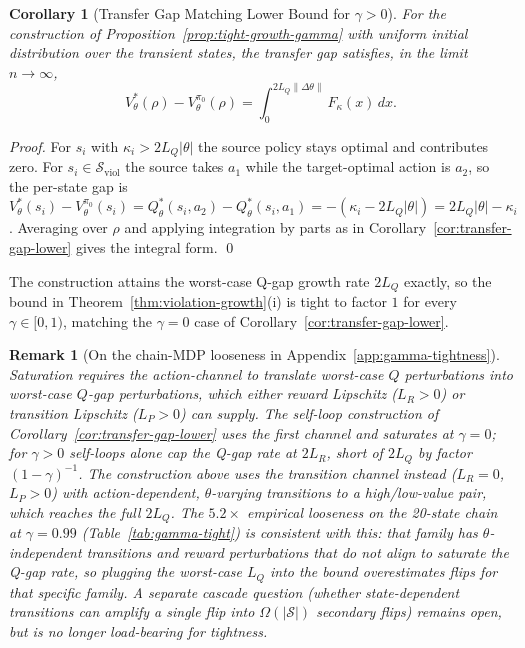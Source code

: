 \documentclass{article}
\newtheorem{corollary}{Corollary}
\newtheorem{remark}{Remark}
\newcommand{\cS}{\mathcal{S}}
\newcommand{\Sviol}{\mathcal{S}_{\mathrm{viol}}}
\begin{document}
\begin{corollary}[Transfer Gap Matching Lower Bound for $\gamma > 0$]
\label{cor:transfer-gap-lower-gamma}
For the construction of Proposition~\ref{prop:tight-growth-gamma} with uniform initial distribution over the transient states, the transfer gap satisfies, in the limit $n \to \infty$,
\[
V^*_\theta(\rho) - V^{\pi_0}_\theta(\rho) = \int_0^{2L_Q\|\Delta\theta\|}\!\! F_\kappa(x)\, dx.
\]
\end{corollary}

\begin{proof}
For $s_i$ with $\kappa_i > 2L_Q|\theta|$ the source policy stays optimal and contributes zero. For $s_i \in \Sviol$ the source takes $a_1$ while the target-optimal action is $a_2$, so the per-state gap is $V^*_\theta(s_i) - V^{\pi_0}_\theta(s_i) = Q^*_\theta(s_i, a_2) - Q^*_\theta(s_i, a_1) = -(\kappa_i - 2L_Q|\theta|) = 2L_Q|\theta| - \kappa_i$. Averaging over $\rho$ and applying integration by parts as in Corollary~\ref{cor:transfer-gap-lower} gives the integral form. \qed
\end{proof}

The construction attains the worst-case Q-gap growth rate $2L_Q$ exactly, so the bound in Theorem~\ref{thm:violation-growth}(i) is tight to factor $1$ for every $\gamma \in [0, 1)$, matching the $\gamma = 0$ case of Corollary~\ref{cor:transfer-gap-lower}.

\begin{remark}[On the chain-MDP looseness in Appendix~\ref{app:gamma-tightness}]
\label{rem:gamma-positive-tightness}
Saturation requires the action-channel to translate worst-case $Q$ perturbations into worst-case $Q$-\emph{gap} perturbations, which either reward Lipschitz ($L_R > 0$) or transition Lipschitz ($L_P > 0$) can supply. The self-loop construction of Corollary~\ref{cor:transfer-gap-lower} uses the first channel and saturates at $\gamma = 0$; for $\gamma > 0$ self-loops alone cap the Q-gap rate at $2L_R$, short of $2L_Q$ by factor $(1-\gamma)^{-1}$. The construction above uses the transition channel instead ($L_R = 0$, $L_P > 0$) with action-dependent, $\theta$-varying transitions to a high/low-value pair, which reaches the full $2L_Q$. The $5.2\times$ empirical looseness on the 20-state chain at $\gamma = 0.99$ (Table~\ref{tab:gamma-tight}) is consistent with this: that family has $\theta$-independent transitions and reward perturbations that do not align to saturate the Q-gap rate, so plugging the worst-case $L_Q$ into the bound overestimates flips for that specific family. A separate cascade question (whether state-dependent transitions can amplify a single flip into $\Omega(|\cS|)$ secondary flips) remains open, but is no longer load-bearing for tightness.
\end{remark}
\end{document}
